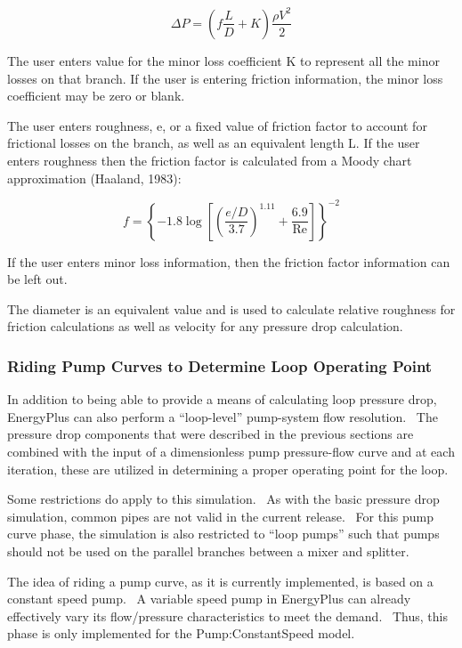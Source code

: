\begin{equation}
\Delta P = \left( {f\frac{L}{D} + K} \right)\frac{{\rho {V^2}}}{2}
\end{equation}

The user enters value for the minor loss coefficient K to represent all the minor losses on that branch. If the user is entering friction information, the minor loss coefficient may be zero or blank.

The user enters roughness, e, or a fixed value of friction factor to account for frictional losses on the branch, as well as an equivalent length L. If the user enters roughness then the friction factor is calculated from a Moody chart approximation (Haaland, 1983):

\begin{equation}
f = {\left\{ { - 1.8\log \left[ {{{\left( {\frac{{e/D}}{{3.7}}} \right)}^{1.11}} + \frac{{6.9}}{{\operatorname{Re} }}} \right]} \right\}^{ - 2}}
\end{equation}

If the user enters minor loss information, then the friction factor information can be left out.

The diameter is an equivalent value and is used to calculate relative roughness for friction calculations as well as velocity for any pressure drop calculation.

\subsubsection{Riding Pump Curves to Determine Loop Operating Point}\label{riding-pump-curves-to-determine-loop-operating-point}

In addition to being able to provide a means of calculating loop pressure drop, EnergyPlus can also perform a ``loop-level'' pump-system flow resolution.~ The pressure drop components that were described in the previous sections are combined with the input of a dimensionless pump pressure-flow curve and at each iteration, these are utilized in determining a proper operating point for the loop.

Some restrictions do apply to this simulation.~ As with the basic pressure drop simulation, common pipes are not valid in the current release.~ For this pump curve phase, the simulation is also restricted to ``loop pumps'' such that pumps should not be used on the parallel branches between a mixer and splitter.

The idea of riding a pump curve, as it is currently implemented, is based on a constant speed pump.~ A variable speed pump in EnergyPlus can already effectively vary its flow/pressure characteristics to meet the demand.~ Thus, this phase is only implemented for the Pump:ConstantSpeed model.

